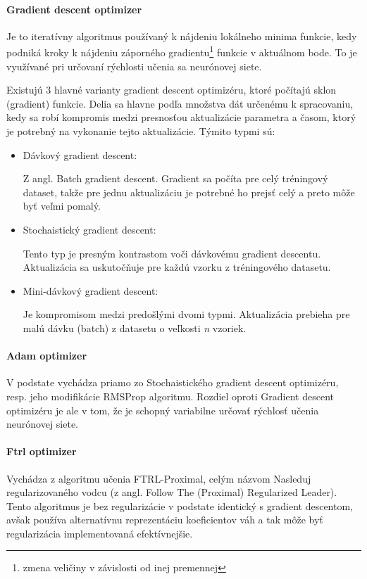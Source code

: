 	\paragraph{Gradient descent optimizer}
	Je to iteratívny algoritmus používaný k nájdeniu lokálneho minima funkcie, kedy podniká kroky k nájdeniu záporného gradientu\footnote{ zmena veličiny v závislosti od inej premennej} funkcie v aktuálnom bode. To je využívané pri určovaní rýchlosti učenia sa neurónovej siete. 
	
	Existujú 3 hlavné varianty gradient descent optimizéru, ktoré počítajú sklon (gradient) funkcie. Delia sa hlavne podľa množstva dát určenému k spracovaniu, kedy sa robí kompromis medzi presnosťou aktualizácie parametra a časom, ktorý je potrebný na vykonanie tejto aktualizácie. Týmito typmi sú:
	\begin{itemize}
		\item{Dávkový gradient descent:}
		
		Z angl. Batch gradient descent. Gradient sa počíta pre celý tréningový dataset, takže pre jednu aktualizáciu je potrebné ho prejsť celý a preto môže byť veľmi pomalý. 
		\item {Stochaistický gradient descent:}
		
		Tento typ je presným kontrastom voči dávkovému gradient descentu. Aktualizácia sa uskutočňuje pre každú vzorku z tréningového datasetu. 
		\item{Mini-dávkový gradient descent:}
		
		Je kompromisom medzi predošlými dvomi typmi. Aktualizácia prebieha pre malú dávku (batch) z datasetu o veľkosti \textit{n} vzoriek.
	\end{itemize} 
	\paragraph{Adam optimizer}
	V podstate vychádza priamo zo Stochaistického gradient descent optimizéru, resp. jeho modifikácie RMSProp algoritmu\cite{rms}. Rozdiel oproti Gradient descent optimizéru je ale v tom, že je schopný variabilne určovať rýchlosť učenia neurónovej siete.
	
	\paragraph{Ftrl optimizer}
	Vychádza z algoritmu učenia FTRL-Proximal\cite{ftrl}, celým názvom Nasleduj regularizovaného vodcu (z angl. Follow The (Proximal) Regularized Leader). Tento algoritmus je bez regularizácie v podstate identický s gradient descentom, avšak používa alternatívnu reprezentáciu koeficientov váh a tak môže byť regularizácia implementovaná efektívnejšie.
	\newline
	
